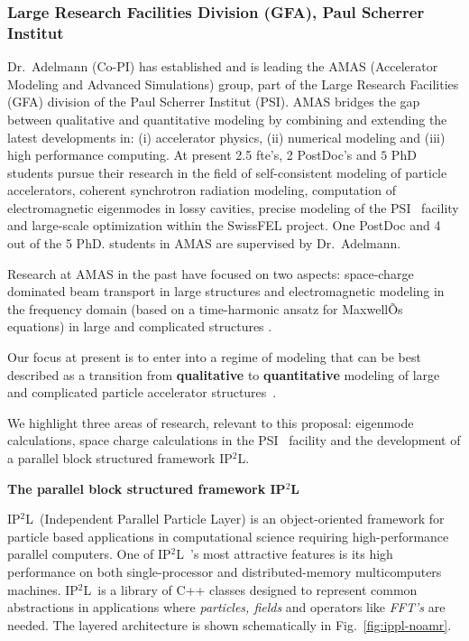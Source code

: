 \documentclass[11pt,pdftex]{article}
\renewcommand{\ippl}{\textsc{IP$^{2}$L}}
\begin{document}
\subsubsection{Large Research Facilities Division (GFA), Paul Scherrer
  Institut}

\noindent Dr.~Adelmann (Co-PI) has established and is leading the AMAS
(Accelerator Modeling and Advanced Simulations) group, part of the Large
Research Facilities (GFA) division of the Paul Scherrer Institut (PSI).
AMAS bridges the gap between qualitative and quantitative modeling by
combining and extending the latest developments in: (i) accelerator
physics, (ii) numerical modeling and (iii) high performance computing.
At present 2.5 fte's, 2 PostDoc's and $5$ PhD students pursue their
research in the field of self-consistent modeling of particle
accelerators, coherent synchrotron radiation modeling, computation of
electromagnetic eigenmodes in lossy cavities, precise modeling of the
PSI \hipa\ facility and large-scale optimization within the SwissFEL project. One PostDoc
and 4 out of the 5 PhD. students in AMAS are supervised by Dr.~Adelmann.

Research at AMAS in the past have focused on two aspects: space-charge
dominated beam transport in large structures \cite{adelmann2002,
  adelmann04-1,geus:02} and electromagnetic modeling in
the frequency domain (based on a time-harmonic ansatz for MaxwellÕs
equations) in large and complicated structures \cite{arge:04,abgh:06}.

Our focus at present is to enter into a regime of modeling that can be
best described as a transition from {\bf qualitative} to {\bf
  quantitative} modeling of large and complicated particle accelerator
structures~\cite{adelmann04-1}.

We highlight three areas of research, relevant to this proposal:
eigenmode calculations, space charge calculations in the PSI \hipa\ facility
and the development of a parallel block structured framework \ippl.


\noindent \textbf{{The parallel block structured framework \ippl}}

\ippl\ (Independent Parallel Particle Layer) is an object-oriented
framework for particle based applications in computational science
requiring high-performance parallel computers. One of \ippl\ 's most
attractive features is its high performance on both single-processor and
distributed-memory multicomputers machines.  \ippl\ is a library of C++
classes designed to represent common abstractions in applications where
\emph{particles, fields} and operators like \emph{FFT's} are needed. The
layered architecture is shown schematically in Fig.~\ref{fig:ippl-noamr}.
\end{document}
